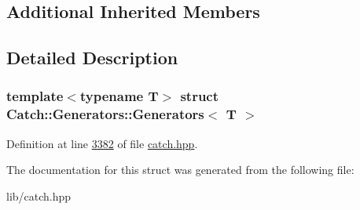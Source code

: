 \subsection*{Additional Inherited Members}


\subsection{Detailed Description}
\subsubsection*{template$<$typename T$>$\newline
struct Catch\+::\+Generators\+::\+Generators$<$ T $>$}



Definition at line \mbox{\hyperlink{catch_8hpp_source_l03382}{3382}} of file \mbox{\hyperlink{catch_8hpp_source}{catch.\+hpp}}.



The documentation for this struct was generated from the following file\+:\begin{DoxyCompactItemize}
\item 
lib/catch.\+hpp\end{DoxyCompactItemize}

